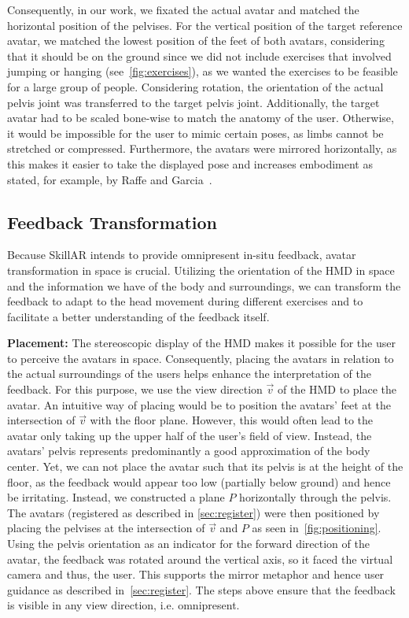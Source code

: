 Consequently, in our work, we fixated the actual avatar and matched the horizontal position of the pelvises. For the vertical position of the target reference avatar, we matched the lowest position of the feet of both avatars, considering that it should be on the ground since we did not include exercises that involved jumping or hanging (see~\autoref{fig:exercises}), as we wanted the exercises to be feasible for a large group of people. Considering rotation, the orientation of the actual pelvis joint was transferred to the target pelvis joint. Additionally, the target avatar had to be scaled bone-wise to match the anatomy of the user. Otherwise, it would be impossible for the user to mimic certain poses, as limbs cannot be stretched or compressed. Furthermore, the avatars were mirrored horizontally, as this makes it easier to take the displayed pose and increases embodiment as stated, for example, by Raffe and Garcia~\cite{raffe2018combining}.

\subsection{Feedback Transformation \label{sec:transformation}}
Because SkillAR intends to provide omnipresent in-situ feedback, avatar transformation in space is crucial. Utilizing the orientation of the HMD in space and the information we have of the body and surroundings, we can transform the feedback to adapt to the head movement during different exercises and to facilitate a better understanding of the feedback itself.

\textbf{Placement:}
The stereoscopic display of the HMD makes it possible for the user to perceive the avatars in space. Consequently, placing the avatars in relation to the actual surroundings of the users helps enhance the interpretation of the feedback. For this purpose, we use the view direction $\vec{v}$ of the HMD to place the avatar. An intuitive way of placing would be to position the avatars' feet at the intersection of $\vec{v}$ with the floor plane. However, this would often lead to the avatar only taking up the upper half of the user's field of view. Instead, the avatars' pelvis represents predominantly a good approximation of the body center. Yet, we can not place the avatar such that its pelvis is at the height of the floor, as the feedback would appear too low (partially below ground) and hence be irritating. Instead, we constructed a plane $P$ horizontally through the pelvis. The avatars (registered as described in \autoref{sec:register}) were then positioned by placing the pelvises at the intersection of $\vec{v}$ and $P$ as seen in~\autoref{fig:positioning}. Using the pelvis orientation as an indicator for the forward direction of the avatar, the feedback was rotated around the vertical axis, so it faced the virtual camera and thus, the user. This supports the mirror metaphor and hence user guidance as described in~\autoref{sec:register}. The steps above ensure that the feedback is visible in any view direction, i.e. omnipresent.

